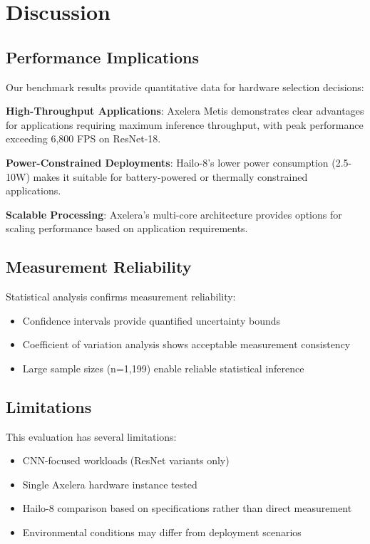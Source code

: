 \documentclass[12pt,draftcls,onecolumn]{IEEEtran}
\begin{document}
\section{Discussion}

\subsection{Performance Implications}

Our benchmark results provide quantitative data for hardware selection decisions:

\textbf{High-Throughput Applications}: Axelera Metis demonstrates clear advantages for applications requiring maximum inference throughput, with peak performance exceeding 6,800 FPS on ResNet-18.

\textbf{Power-Constrained Deployments}: Hailo-8's lower power consumption (2.5-10W) makes it suitable for battery-powered or thermally constrained applications.

\textbf{Scalable Processing}: Axelera's multi-core architecture provides options for scaling performance based on application requirements.

\subsection{Measurement Reliability}

Statistical analysis confirms measurement reliability:
\begin{itemize}
    \item Confidence intervals provide quantified uncertainty bounds
    \item Coefficient of variation analysis shows acceptable measurement consistency
    \item Large sample sizes (n=1,199) enable reliable statistical inference
\end{itemize}

\subsection{Limitations}

This evaluation has several limitations:
\begin{itemize}
    \item CNN-focused workloads (ResNet variants only)
    \item Single Axelera hardware instance tested
    \item Hailo-8 comparison based on specifications rather than direct measurement
    \item Environmental conditions may differ from deployment scenarios
\end{itemize}
\end{document}
